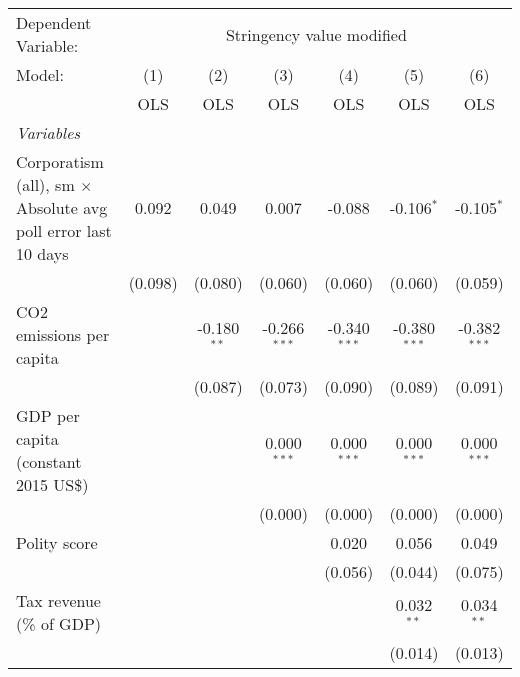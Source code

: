 
\begingroup
\centering
\begin{tabular}{lcccccc}
   \toprule
   Dependent Variable: & \multicolumn{6}{c}{Stringency value modified}\\
   Model:                                                               & (1)     & (2)           & (3)            & (4)            & (5)            & (6)\\  
                                                                        &  OLS    & OLS           & OLS            & OLS            & OLS            & OLS\\  
   \midrule
   \emph{Variables}\\
   Corporatism (all), sm $\times$ Absolute avg poll error last 10 days  & 0.092   & 0.049         & 0.007          & -0.088         & -0.106$^{*}$   & -0.105$^{*}$\\   
                                                                        & (0.098) & (0.080)       & (0.060)        & (0.060)        & (0.060)        & (0.059)\\   
   CO2 emissions per capita                                             &         & -0.180$^{**}$ & -0.266$^{***}$ & -0.340$^{***}$ & -0.380$^{***}$ & -0.382$^{***}$\\   
                                                                        &         & (0.087)       & (0.073)        & (0.090)        & (0.089)        & (0.091)\\   
   GDP per capita (constant 2015 US\$)                                  &         &               & 0.000$^{***}$  & 0.000$^{***}$  & 0.000$^{***}$  & 0.000$^{***}$\\   
                                                                        &         &               & (0.000)        & (0.000)        & (0.000)        & (0.000)\\   
   Polity score                                                         &         &               &                & 0.020          & 0.056          & 0.049\\   
                                                                        &         &               &                & (0.056)        & (0.044)        & (0.075)\\   
   Tax revenue (\% of GDP)                                              &         &               &                &                & 0.032$^{**}$   & 0.034$^{**}$\\   
                                                                        &         &               &                &                & (0.014)        & (0.013)\\   

\end{tabular}
